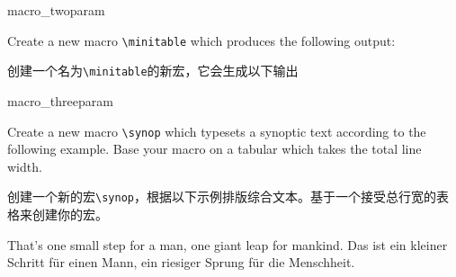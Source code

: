 \begin{dispExample}
\begin{texercise}{macro_twoparam}
\begin{tcboutputlisting}
\newcommand{\minitable}[2]{%
\begin{center}\begin{tabular}{p{10cm}}\hline%
\multicolumn{1}{c}{\bfseries#1}\\\hline%
#2\\\hline%
\end{tabular}\end{center}}
\end{tcboutputlisting}
\tcbuselistingtext%
Create a new macro \verb+\minitable+ which produces the
following output:

创建一个名为\verb+\minitable+的新宏，它会生成以下输出\par\smallskip
\begin{tcbwritetemp}
\end{tcbwritetemp}
\tcbusetemplisting\par\smallskip\tcbusetemp%
\end{texercise}
\end{dispExample}


\begin{dispExample}
\begin{texercise}{macro_threeparam}
\begin{tcboutputlisting}
\newcommand{\synop}[3]{%
\begin{tabular}{@{}p{(\linewidth-\tabcolsep*2-\arrayrulewidth)/2}|%
p{(\linewidth-\tabcolsep*2-\arrayrulewidth)/2}@{}}\hline
\multicolumn{2}{c}{\bfseries #1}\\\hline
\multicolumn{1}{c|}{\itshape English}&
\multicolumn{1}{c}{\itshape German}\\\hline
#2 & #3
\end{tabular}}
\end{tcboutputlisting}
\tcbuselistingtext%
Create a new macro \verb+\synop+ which typesets a synoptic text according
to the following example. Base your macro on a tabular which takes the
total line width.

创建一个新的宏\verb+\synop+，根据以下示例排版综合文本。基于一个接受总行宽的表格来创建你的宏。\par\smallskip
\begin{tcbwritetemp}
%
{That's one small step for a man, one giant leap for mankind.}%
{Das ist ein kleiner Schritt f\"{u}r einen Mann,
ein riesiger Sprung f\"{u}r die Menschheit.}
\end{tcbwritetemp}
\tcbusetemplisting\par\smallskip\tcbusetemp%
\end{texercise}
\end{dispExample}

